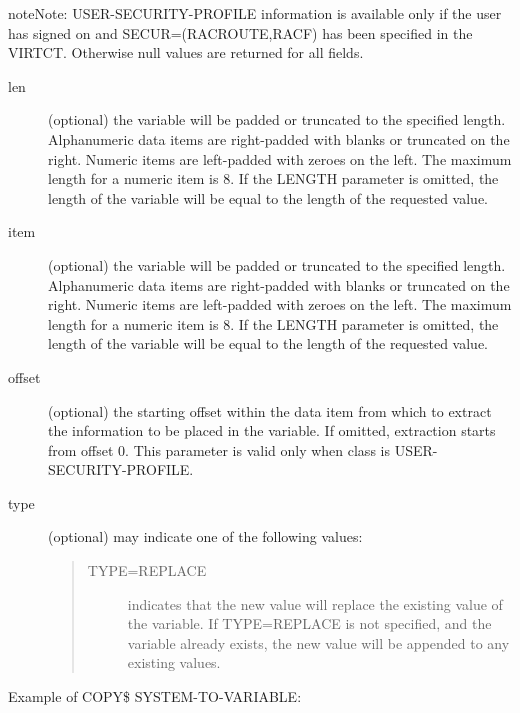 \documentclass[letterpaper,10pt,english]{sphinxmanual}
\begin{document}
\begin{sphinxadmonition}{note}{Note:}
USER-SECURITY-PROFILE information is available only if the user has signed on and SECUR=(RACROUTE,RACF) has been specified in the VIRTCT. Otherwise null values are returned for all fields.
\end{sphinxadmonition}
\begin{description}
\item[{len}] \leavevmode
(optional) the variable will be padded or truncated to the specified length. Alphanumeric data items are right-padded with blanks or truncated on the right. Numeric items are left-padded with zeroes on the left. The maximum length for a numeric item is 8. If the LENGTH parameter is omitted, the length of the variable will be equal to the length of the requested value.

\item[{item}] \leavevmode
(optional) the variable will be padded or truncated to the specified length. Alphanumeric data items are right-padded with blanks or truncated on the right. Numeric items are left-padded with zeroes on the left. The maximum length for a numeric item is 8. If the LENGTH parameter is omitted, the length of the variable will be equal to the length of the requested value.

\item[{offset}] \leavevmode
(optional) the starting offset within the data item from which to extract the information to be placed in the variable. If omitted, extraction starts from offset 0. This parameter is valid only when class is USER-SECURITY-PROFILE.

\item[{type}] \leavevmode
(optional) may indicate one of the following values:
\begin{quote}
\begin{description}
\item[{TYPE=REPLACE}] \leavevmode
indicates that the new value will replace the existing value of the variable. If TYPE=REPLACE is not specified, and the variable already exists, the new value will be appended to any existing values.

\end{description}
\end{quote}

\end{description}

Example of COPY\$ SYSTEM-TO-VARIABLE:
\end{document}
